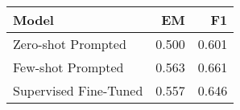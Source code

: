 \begin{tabular}{lrr}
\toprule
Model & EM & F1 \\
\midrule
Zero-shot Prompted & 0.500 & 0.601 \\
Few-shot Prompted & 0.563 & 0.661 \\
Supervised Fine-Tuned & 0.557 & 0.646 \\
\bottomrule
\end{tabular}
